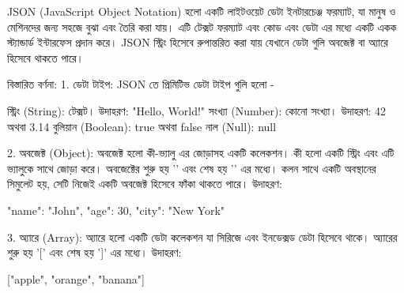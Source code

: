 
JSON (JavaScript Object Notation) হলো একটি লাইটওয়েট ডেটা ইনটারচেঞ্জ ফরম্যাট, যা মানুষ ও মেশিনদের জন্য সহজে বুঝা এবং তৈরি করা যায়। এটি টেক্সট ফরম্যাট এবং কোড এবং ডেটা এর মধ্যে একটি একক স্ট্যান্ডার্ড ইন্টারফেস প্রদান করে। JSON স্ট্রিং হিসেবে রুপান্তরিত করা যায় যেখানে ডেটা গুলি অবজেক্ট বা অ্যারে হিসেবে থাকতে পারে।

বিস্তারিত বর্ণনা:
1. ডেটা টাইপ:
JSON তে প্রিমিটিভ ডেটা টাইপ গুলি হলো -

স্ট্রিং (String): টেক্সট। উদাহরণ: "Hello, World!"
সংখ্যা (Number): কোনো সংখ্যা। উদাহরণ: 42 অথবা 3.14
বুলিয়ান (Boolean): true অথবা false
নাল (Null): null

2. অবজেক্ট (Object):
অবজেক্ট হলো কী-ভ্যালু এর জোড়াসহ একটি কলেকশন। কী হলো একটি স্ট্রিং এবং এটি ভ্যালুকে সাথে জোড়া করে। অবজেক্টের শুরু হয় '{' এবং শেষ হয় '}' এর মধ্যে। কলন সাথে একটি অবস্থানের সিমুলেট হয়, সেটি নিজেই একটি অবজেক্ট হিসেবে ফাঁকা থাকতে পারে। উদাহরণ:

{
  "name": "John",
  "age": 30,
  "city": "New York"
}

3. অ্যারে (Array):
অ্যারে হলো একটি ডেটা কলেকশন যা সিরিজে এবং ইনডেক্সড ডেটা হিসেবে থাকে। অ্যারের শুরু হয় '[' এবং শেষ হয় ']' এর মধ্যে। উদাহরণ:

["apple", "orange", "banana"]

